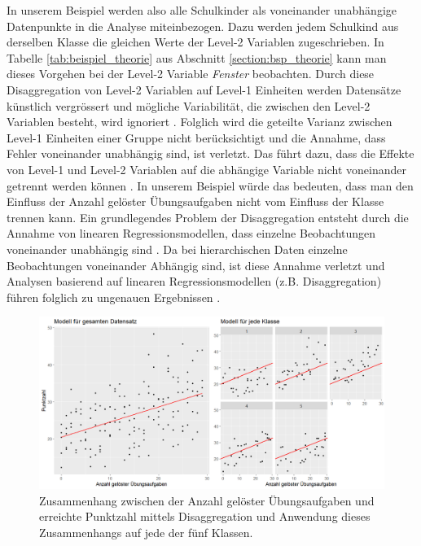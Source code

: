\documentclass[12pt, a4paper]{article}\usepackage[]{graphicx}\usepackage[]{color}
\begin{document}
In unserem Beispiel werden also alle Schulkinder als voneinander unabhängige Datenpunkte in die Analyse miteinbezogen. Dazu werden jedem Schulkind aus derselben Klasse die gleichen Werte der Level-2 Variablen zugeschrieben. In Tabelle \ref{tab:beispiel_theorie} aus Abschnitt \ref{section:bsp_theorie} kann man dieses Vorgehen bei der Level-2 Variable \textit{Fenster} beobachten. Durch diese Disaggregation von Level-2 Variablen auf Level-1 Einheiten werden Datensätze künstlich vergrössert und mögliche Variabilität, die zwischen den Level-2 Variablen besteht, wird ignoriert \citep{SnijdersTomA.B2012Ma:a, woltman2012introduction}. Folglich wird die geteilte Varianz zwischen Level-1 Einheiten einer Gruppe nicht berücksichtigt und die Annahme, dass Fehler voneinander unabhängig sind, ist verletzt. Das führt dazu, dass die Effekte von Level-1 und Level-2 Variablen auf die abhängige Variable nicht voneinander getrennt werden können \citep{woltman2012introduction}. In unserem Beispiel würde das bedeuten, dass man den Einfluss der Anzahl gelöster Übungsaufgaben nicht vom Einfluss der Klasse trennen kann. Ein grundlegendes Problem der Disaggregation entsteht durch die Annahme von linearen Regressionsmodellen, dass einzelne Beobachtungen voneinander unabhängig sind \citep{woltman2012introduction}. Da bei hierarchischen Daten einzelne Beobachtungen voneinander Abhängig sind, ist diese Annahme verletzt und Analysen basierend auf linearen Regressionsmodellen (z.B. Disaggregation) führen folglich zu ungenauen Ergebnissen \citep{andrew_data, SnijdersTomA.B2012Ma:a, woltman2012introduction}.

\begin{figure}[t!]
\centering
\includegraphics[width = \textwidth]{./figures/disaggregation_combined}
\caption{Zusammenhang zwischen der Anzahl gelöster Übungsaufgaben und erreichte Punktzahl mittels Disaggregation und Anwendung dieses Zusammenhangs auf jede der fünf Klassen.}
\label{fig:disaggregation}
\end{figure}
\end{document}

